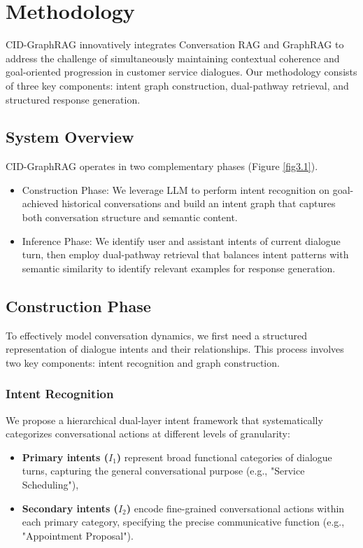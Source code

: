 \documentclass[
]{style/ceurart}
\begin{document}
\section{Methodology}

CID-GraphRAG innovatively integrates Conversation RAG and GraphRAG to address the challenge of simultaneously maintaining contextual coherence and goal-oriented progression in customer service dialogues. Our methodology consists of three key components: intent graph construction, dual-pathway retrieval, and structured response generation.

\subsection {System Overview}  
CID-GraphRAG operates in two complementary phases (Figure \ref{fig3.1}).

\begin {itemize}
\item Construction Phase: We leverage LLM to perform intent recognition on goal-achieved historical conversations and build an intent graph that captures both conversation structure and semantic content.
\item Inference Phase: We identify user and assistant intents of current dialogue turn, then employ dual-pathway retrieval that balances intent patterns with semantic similarity to identify relevant examples for response generation.
\end {itemize}

\subsection {Construction Phase}  
To effectively model conversation dynamics, we first need a structured representation of dialogue intents and their relationships. This process involves two key components: intent recognition and graph construction.

\subsubsection {Intent Recognition}  
We propose a hierarchical dual-layer intent framework that systematically categorizes conversational actions at different levels of granularity:

\begin{itemize}
    \item \textbf{Primary intents ($I_{1}$)} represent broad functional categories of dialogue turns, capturing the general conversational purpose (e.g., "Service Scheduling"),
    \item \textbf{Secondary intents ($I_{2}$)} encode fine-grained conversational actions within each primary category, specifying the precise communicative function (e.g., "Appointment Proposal").
\end{itemize}
\end{document}
